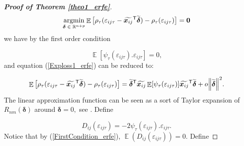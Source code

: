 \documentclass[15pt,a4paper]{article}
\DeclareMathOperator{\E}{\mathbb{E}}
\newcommand{\norm}[1]{\left\lVert#1\right\rVert}
\newcommand{\argmin}{\operatornamewithlimits{argmin}}
\newcommand{\transpose}{{}^{\text{\sffamily T}}}
\newcommand{\smallO}{o}
\begin{document}
\begin{proof}[\textbf{Proof of Theorem \ref{theo1_erfe}}]
\begin{equation*}
   \argmin_{\boldsymbol{\delta}\;\in\;\mathbb{R}^{n+p}} \E\big[\rho_\tau(\varepsilon_{ij\tau}-\widetilde{\boldsymbol{x}_{ij}}\transpose\widetilde{\boldsymbol{\delta}})-\rho_\tau(\varepsilon_{ij\tau})\big]=\boldsymbol{0}
\end{equation*}
we have by the first order condition


\begin{equation}\label{FirstCondition_erfe}
    \E[\psi_\tau(\varepsilon_{ij\tau}).\varepsilon_{ij\tau}]=0,
\end{equation}
and equation (\ref{Exploss1_erfe}) can be reduced to:

\begin{equation}\label{Exploss2_erfe}
    \E\big[\rho_\tau(\varepsilon_{ij\tau}-\widetilde{\boldsymbol{x}_{ij}}\transpose\widetilde{\boldsymbol{\delta}})-
    \rho_\tau(\varepsilon_{ij\tau})
    \big]=\widetilde{\boldsymbol{\delta}}\transpose\widetilde{\boldsymbol{x}_{ij}}\E[\psi_\tau(\varepsilon_{ij\tau})]
    \widetilde{\boldsymbol{x}_{ij}}\transpose \widetilde{\boldsymbol{\delta}} + \smallO{\norm{\widetilde{\boldsymbol{\delta}}}^2}.
\end{equation}
The linear approximation function can be seen as a sort of Taylor expansion of $R_{nm}(\boldsymbol{\delta})$ around  $\boldsymbol{\delta}=0,$ see \citep{pollard_asymptotics_1991}. Define

\begin{equation}\label{Approx1_erfe}
D_{ij}(\varepsilon_{ij\tau})= -2\psi_\tau(\varepsilon_{ij\tau}).\varepsilon_{ij\tau}.
\end{equation}
Notice that by (\ref{FirstCondition_erfe}), \;$\E(D_{ij}(\varepsilon_{ij\tau}))=0.$ Define


\end{proof}
\end{document}
